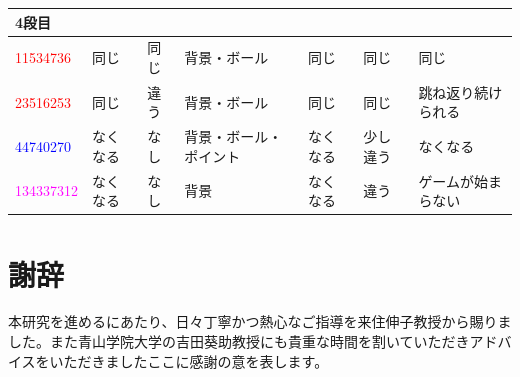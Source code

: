 \documentclass[a4paper,10pt,onecolumn,oneside,openany]{jsbook}
\begin{document}
\begin{table}[h]
\begin{center}
\begin{tabular}{|p{1.7cm}||p{1cm}|p{1cm}|p{1.7cm}|p{2cm}|p{1cm}|p{1.7cm}|}
4段目 &  &  &  &  &  &  \\ \hline
\textcolor{red}{11534736} & 同じ & 同じ & 背景・ボール & 同じ & 同じ & 同じ \\ \hline
\textcolor{red}{23516253} & 同じ & 違う & 背景・ボール & 同じ & 同じ & 跳ね返り続けられる \\ \hline
\textcolor{blue}{44740270} & なくなる & なし & 背景・ボール・ポイント & なくなる & 少し違う & なくなる \\ \hline
\textcolor{magenta}{134337312} & なくなる & なし & 背景 & なくなる & 違う & ゲームが始まらない \\ \hline

\end{tabular}
\end{center}
\end{table}



%
\chapter{謝辞}
本研究を進めるにあたり、日々丁寧かつ熱心なご指導を来住伸子教授から賜りました。また青山学院大学の吉田葵助教授にも貴重な時間を割いていただきアドバイスをいただきましたここに感謝の意を表します。
%
%
\end{document}
